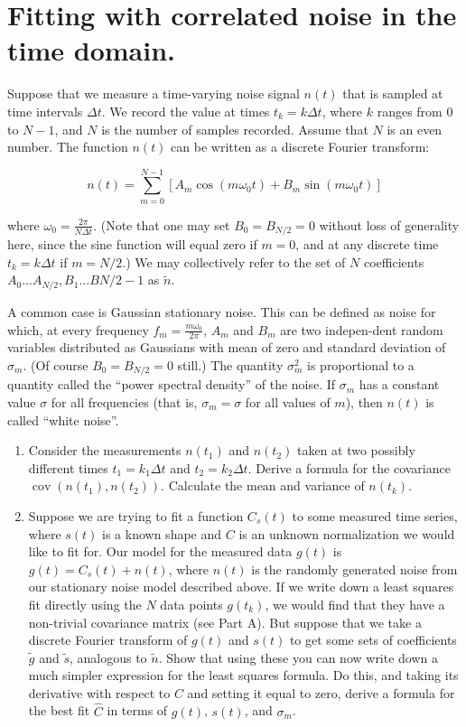 \section{Fitting with correlated noise in the time domain.}

Suppose that we measure a time-varying noise signal $n(t)$ that is sampled
at time intervals $\Delta t$. We record the value at times $t_k = k\Delta t$, where $k$ ranges
from 0 to $N-1$, and $N$ is the number of samples recorded. Assume that $N$ is an
even number. The function $n(t)$ can be written as a discrete Fourier transform:

$$n(t) = \sum_{m=0}^{N-1}[A_m\cos(m\omega_0 t) + B_m \sin(m\omega_0 t)]$$

where $\omega_0 = \frac{2\pi}{N\Delta t}$. (Note that one may set $B_0 = B_{N/2} = 0$ without loss of generality here, since the sine function will equal zero if $m = 0$, and at any discrete time $t_k = k\Delta t$ if $m = N/2$.) We may collectively refer to the set of $N$ coefficients $A_0...A_{N/2}, B_1...B{N/2-1}$ as $\tilde{n}$.

A common case is Gaussian stationary noise. This can be defined as noise for which, at every frequency $f_m = \frac{m\omega_0}{2\pi}$, $A_m$ and $B_m$ are two indepen-dent random variables distributed as Gaussians with mean of zero and standard deviation of $\sigma_m$. (Of course $B_0 = B_{N/2} = 0$ still.) The quantity $\sigma_m^2$ is proportional to a quantity called the “power spectral density” of the noise. If $\sigma_m$ has a constant value $\sigma$ for all frequencies (that is, $\sigma_m = \sigma$ for all values of $m$), then
$n(t)$ is called ``white noise''.


\begin{enumerate}[label=\textbf{\Alph*}.]
    \item Consider the measurements $n(t_1)$ and $n(t_2)$ taken at two possibly different
    times $t_1 = k_1\Delta t$ and $t_2 = k_2\Delta t$. Derive a formula for the covariance
    $\operatorname{cov}(n(t_1), n(t_2))$. Calculate the mean and variance of $n(t_k)$.

    \item Suppose we are trying to fit a function $C_s(t)$ to some measured time series, where $s(t)$ is a known shape and $C$ is an unknown normalization we would like to fit for. Our model for the measured data $g(t)$ is $g(t) = C_s(t) + n(t)$, where $n(t)$ is the randomly generated noise from our stationary noise model described above. If we write down a least squares fit directly using the $N$ data points $g(t_k)$, we would find that they have a non-trivial covariance matrix (see Part A). But suppose that we take a discrete Fourier transform of $g(t)$ and $s(t)$ to get some sets of coefficients $\tilde{g}$ and $\tilde{s}$, analogous to $\tilde{n}$. Show that using these you can now write down a much simpler expression for the least squares formula. Do this, and taking its derivative with respect to $C$ and setting it equal to zero, derive a formula for the best fit $\hat{C}$ in terms of $g(t)$, $s(t)$, and $\sigma_m$.

\end{enumerate}
